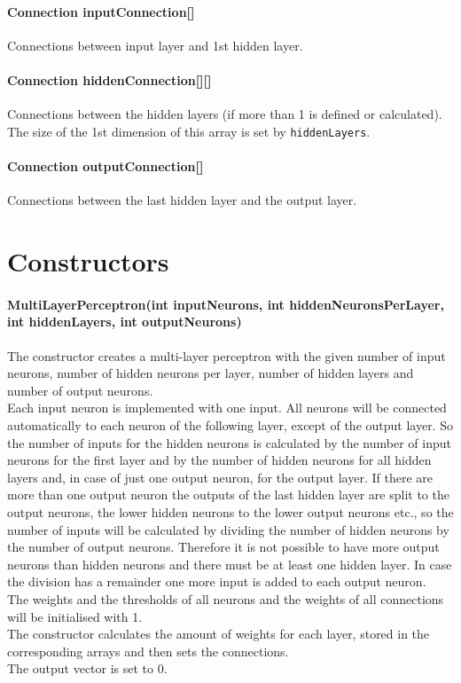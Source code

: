 \paragraph{Connection inputConnection[]}
Connections between input layer and 1st hidden layer.

\paragraph{Connection hiddenConnection[][]}
Connections between the hidden layers (if more than 1 is defined or calculated). The size of the 1st dimension of this array is set by \texttt{hiddenLayers}.

\paragraph{Connection outputConnection[]}
Connections between the last hidden layer and the output layer.

\section{Constructors}
\paragraph{MultiLayerPerceptron(int inputNeurons, int hiddenNeuronsPerLayer, int hiddenLayers, int outputNeurons)}
The constructor creates a multi-layer perceptron with the given number of input neurons, number of hidden neurons per layer, number of hidden layers and number of output neurons.\\
Each input neuron is implemented with one input. All neurons will be connected automatically to each neuron of the following layer, except of the output layer. So the number of inputs for the hidden neurons is calculated by the number of input neurons for the first layer and by the number of hidden neurons for all hidden layers and, in case of just one output neuron, for the output layer. If there are more than one output neuron the outputs of the last hidden layer are split to the output neurons, the lower hidden neurons to the lower output neurons etc., so the number of inputs will be calculated by dividing the number of hidden neurons by the number of output neurons. Therefore it is not possible to have more output neurons than hidden neurons and there must be at least one hidden layer. In case the division has a remainder one more input is added to each output neuron.\\
The weights and the thresholds of all neurons and the weights of all connections will be initialised with 1.\\
The constructor calculates the amount of weights for each layer, stored in the corresponding arrays and then sets the connections.\\
The output vector is set to 0.

